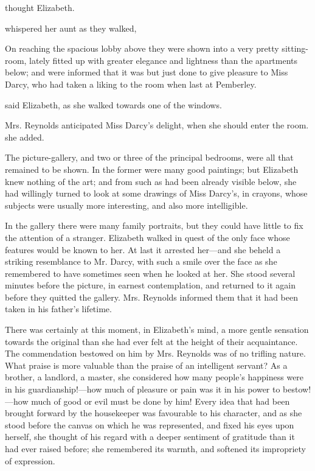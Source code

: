  thought Elizabeth.

 whispered her aunt as they walked, 



On reaching the spacious lobby above they were shown into a very pretty sitting-room, lately fitted up with greater elegance and lightness than the apartments below; and were informed that it was but just done to give pleasure to Miss Darcy, who had taken a liking to the room when last at Pemberley.

 said Elizabeth, as she walked towards one of the windows.

Mrs. Reynolds anticipated Miss Darcy's delight, when she should enter the room.  she added. 

The picture-gallery, and two or three of the principal bedrooms, were all that remained to be shown. In the former were many good paintings; but Elizabeth knew nothing of the art; and from such as had been already visible below, she had willingly turned to look at some drawings of Miss Darcy's, in crayons, whose subjects were usually more interesting, and also more intelligible.

In the gallery there were many family portraits, but they could have little to fix the attention of a stranger. Elizabeth walked in quest of the only face whose features would be known to her. At last it arrested her---and she beheld a striking resemblance to Mr. Darcy, with such a smile over the face as she remembered to have sometimes seen when he looked at her. She stood several minutes before the picture, in earnest contemplation, and returned to it again before they quitted the gallery. Mrs. Reynolds informed them that it had been taken in his father's lifetime.

There was certainly at this moment, in Elizabeth's mind, a more gentle sensation towards the original than she had ever felt at the height of their acquaintance. The commendation bestowed on him by Mrs. Reynolds was of no trifling nature. What praise is more valuable than the praise of an intelligent servant? As a brother, a landlord, a master, she considered how many people's happiness were in his guardianship!---how much of pleasure or pain was it in his power to bestow!---how much of good or evil must be done by him! Every idea that had been brought forward by the housekeeper was favourable to his character, and as she stood before the canvas on which he was represented, and fixed his eyes upon herself, she thought of his regard with a deeper sentiment of gratitude than it had ever raised before; she remembered its warmth, and softened its impropriety of expression.

